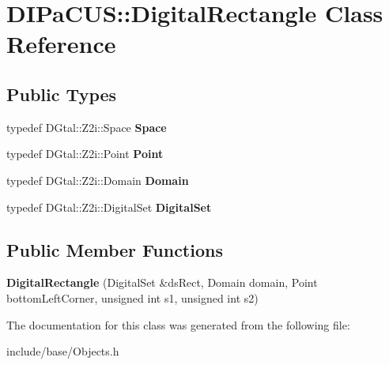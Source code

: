 \hypertarget{classDIPaCUS_1_1DigitalRectangle}{}\section{D\+I\+Pa\+C\+US\+:\+:Digital\+Rectangle Class Reference}
\label{classDIPaCUS_1_1DigitalRectangle}
\subsection*{Public Types}
\begin{DoxyCompactItemize}
\item 
\mbox{\label{classDIPaCUS_1_1DigitalRectangle_abb8cfa1e4aa718a6b90ed80f768b9022}} 
typedef D\+Gtal\+::\+Z2i\+::\+Space {\bfseries Space}
\item 
\mbox{\label{classDIPaCUS_1_1DigitalRectangle_a23b27d2eb59dea93215db5c3294d0cec}} 
typedef D\+Gtal\+::\+Z2i\+::\+Point {\bfseries Point}
\item 
\mbox{\label{classDIPaCUS_1_1DigitalRectangle_a692d960f82a12d81ea13ce4cca036bee}} 
typedef D\+Gtal\+::\+Z2i\+::\+Domain {\bfseries Domain}
\item 
\mbox{\label{classDIPaCUS_1_1DigitalRectangle_a958bb6fa088b4e3fcb9e70027c081ce6}} 
typedef D\+Gtal\+::\+Z2i\+::\+Digital\+Set {\bfseries Digital\+Set}
\end{DoxyCompactItemize}
\subsection*{Public Member Functions}
\begin{DoxyCompactItemize}
\item 
\mbox{\label{classDIPaCUS_1_1DigitalRectangle_a29a002b52bb0e7f735663b7f814d19d6}} 
{\bfseries Digital\+Rectangle} (Digital\+Set \&ds\+Rect, Domain domain, Point bottom\+Left\+Corner, unsigned int s1, unsigned int s2)
\end{DoxyCompactItemize}


The documentation for this class was generated from the following file\+:\begin{DoxyCompactItemize}
\item 
include/base/Objects.\+h\end{DoxyCompactItemize}
